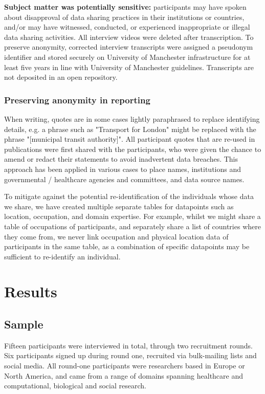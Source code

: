 \documentclass{CUP-JNL-DAP}%
\begin{document}
\textbf{Subject matter was potentially sensitive:} participants may have spoken about disapproval of data sharing practices in their institutions or countries, and/or may have witnessed, conducted, or experienced inappropriate or illegal data sharing activities. All interview videos were deleted after transcription. To preserve anonymity, corrected interview transcripts were assigned a pseudonym identifier and stored securely on University of Manchester infrastructure for at least five years in line with University of Manchester guidelines. Transcripts are not deposited in an open repository. 

\subsubsection{Preserving anonymity in reporting}
When writing, quotes are in some cases lightly paraphrased to replace identifying details, e.g. a phrase such as "Transport for London" might be replaced with the phrase "[municipal transit authority]". All participant quotes that are re-used in publications were first shared with the participants, who were given the chance to amend or redact their statements to avoid inadvertent data breaches. This approach has been applied in various cases to place names, institutions and governmental / healthcare agencies and committees, and data source names. 

To mitigate against the potential re-identification of the individuals whose data we share, we have created multiple separate tables for datapoints such as location, occupation, and domain expertise. For example, whilst we might share a table of occupations of participants, and separately share a list of countries where they come from, we never link occupation and physical location data of participants in the same table, as a combination of specific datapoints may be sufficient to re-identify an individual.

\section{Results}
\subsection{Sample}
Fifteen participants were interviewed in total, through two recruitment rounds. Six participants signed up during round one, recruited via bulk-mailing lists and social media. All round-one participants were researchers based in Europe or North America, and came from a range of domains spanning healthcare and computational, biological and social research.
\end{document}
